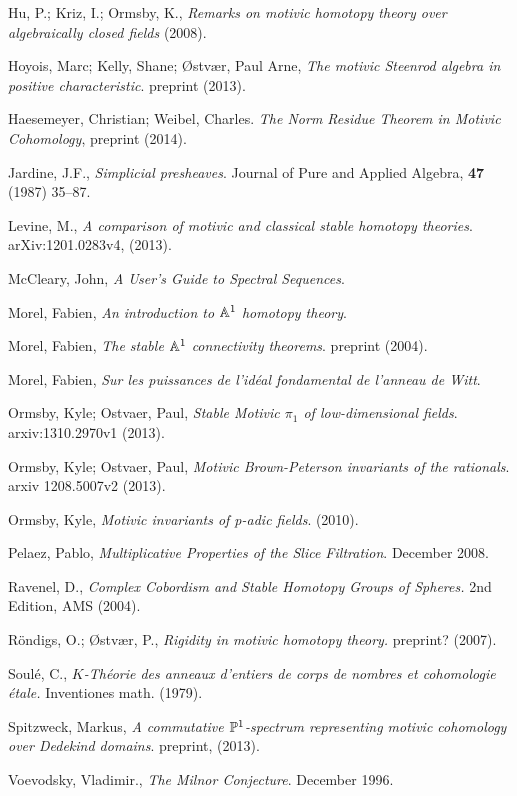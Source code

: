 \documentclass{amsart}%
\begin{document}
\begin{thebibliography}{OOOO}
     Hu, P.; Kriz, I.; Ormsby, K., {\it Remarks on
    motivic homotopy theory over algebraically closed fields} (2008).

     Hoyois, Marc; Kelly, Shane; {\O}stv{\ae}r,
  Paul Arne, {\it The motivic Steenrod algebra in positive
    characteristic}. preprint (2013).

     Haesemeyer, Christian; Weibel, Charles. {\it The
    Norm Residue Theorem in Motivic Cohomology}, preprint (2014).

     Jardine, J.F., {\it Simplicial
    presheaves}. Journal of Pure and Applied Algebra, {\bf 47} (1987)
  35--87.

     Levine, M., {\it A comparison of motivic and
    classical stable homotopy theories}. arXiv:1201.0283v4, (2013).

     McCleary, John, {\it A User's Guide to
    Spectral Sequences}.

     Morel, Fabien, {\it An introduction to $\mathbb{A}^1$
    homotopy theory}.

     Morel, Fabien, {\it The stable $\mathbb{A}^1$
    connectivity theorems}. preprint (2004).

     Morel, Fabien, {\it Sur les puissances
    de l'id\'eal fondamental de l'anneau de Witt}.

     Ormsby, Kyle; Ostvaer, Paul, {\it
    Stable Motivic $\pi_1$ of low-dimensional
    fields}. arxiv:1310.2970v1 (2013).

     Ormsby, Kyle; Ostvaer, Paul, {\it
    Motivic Brown-Peterson invariants of the rationals}. arxiv
  1208.5007v2 (2013).

     Ormsby, Kyle, {\it Motivic invariants of
    p-adic fields}. (2010).

     Pelaez, Pablo, {\it Multiplicative Properties
    of the Slice Filtration}.  December 2008.

     Ravenel, D., {\it Complex Cobordism and
    Stable Homotopy Groups of Spheres.} 2nd Edition, AMS (2004).

     R{\"o}ndigs, O.; {\O}stv{\ae}r, P., {\it
    Rigidity in motivic homotopy theory.} preprint? (2007).

     Soul{\'e}, C., {\it $K$-Th{\'e}orie des
    anneaux d'entiers de corps de nombres et cohomologie {\'e}tale.}
  Inventiones math. (1979).

     Spitzweck, Markus, {\it A commutative
    $\mathbb{P}^1$-spectrum representing motivic cohomology over Dedekind
    domains}. preprint, (2013).

     Voevodsky, Vladimir., {\it The Milnor
    Conjecture}. December 1996. 

\end{thebibliography}
\end{document}
